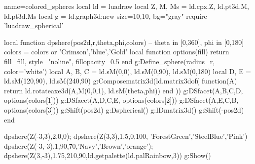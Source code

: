 \documentclass[tikz]{standalone}
\begin{document}
\begin{luadraw}{name=colored_spheres}
local ld = luadraw
local Z, M, Ms = ld.cpx.Z, ld.pt3d.M, ld.pt3d.Ms
local g = ld.graph3d:new{ size={10,10}, bg="gray" }
require 'luadraw_spherical'

local function dpshere(pos2d,r,theta,phi,colors) -- theta in [0,360], phi in [0,180]
    colors = colors or {'Crimson','blue','Gold'}
    local function options(fill)
        return {fill=fill, style="noline", fillopacity=0.5}
    end
    g:Define_sphere({radius=r, color='white'})
    local A, B, C = ld.sM(0,0), ld.sM(0,90), ld.sM(0,180)
    local D, E = ld.sM(120,90), ld.sM(240,90)
    g:Composematrix3d(ld.matrix3dof( function(A) return ld.rotateaxe3d(A,M(0,0,1), ld.sM(theta,phi)) end ))
    g:DSfacet({A,B,C,D}, options(colors[1]))
    g:DSfacet({A,D,C,E}, options(colors[2]))
    g:DSfacet({A,E,C,B}, options(colors[3]))
    g:Shift(pos2d)
    g:Dspherical()
    g:IDmatrix3d()
    g:Shift(-pos2d)
end

dpshere(Z(-3,3),2,0,0); dpshere(Z(3,3),1.5,0,100, {'ForestGreen','SteelBlue','Pink'})
dpshere(Z(-3,-3),1,90,70,{'Navy','Brown','orange'}); 
dpshere(Z(3,-3),1.75,210,90,ld.getpalette(ld.palRainbow,3))
g:Show()
\end{luadraw}
\end{document}

